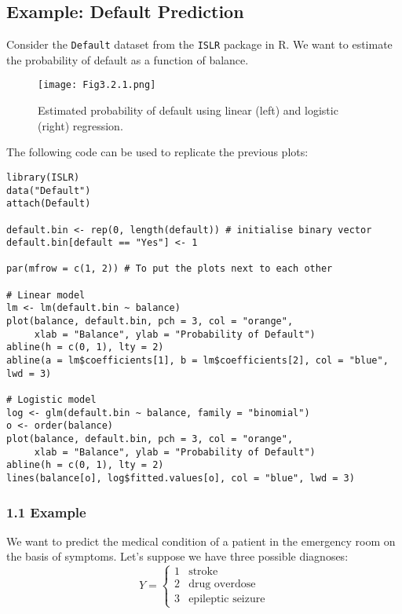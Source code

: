\documentclass[11pt]{article}
\begin{document}
\subsection{Example: Default Prediction}

Consider the \texttt{Default} dataset from the \texttt{ISLR} package in R. We want to estimate the probability of default as a function of balance.

\begin{figure}[ht]
\centering
\texttt{[image: Fig3.2.1.png]}
\caption{Estimated probability of default using linear (left) and logistic (right) regression.}
\end{figure}

The following code can be used to replicate the previous plots:

\begin{verbatim}
library(ISLR)
data("Default")
attach(Default)

default.bin <- rep(0, length(default)) # initialise binary vector
default.bin[default == "Yes"] <- 1

par(mfrow = c(1, 2)) # To put the plots next to each other

# Linear model
lm <- lm(default.bin ~ balance)
plot(balance, default.bin, pch = 3, col = "orange",
     xlab = "Balance", ylab = "Probability of Default")
abline(h = c(0, 1), lty = 2)
abline(a = lm$coefficients[1], b = lm$coefficients[2], col = "blue", lwd = 3)

# Logistic model
log <- glm(default.bin ~ balance, family = "binomial")
o <- order(balance)
plot(balance, default.bin, pch = 3, col = "orange",
     xlab = "Balance", ylab = "Probability of Default")
abline(h = c(0, 1), lty = 2)
lines(balance[o], log$fitted.values[o], col = "blue", lwd = 3)
\end{verbatim}

\subsubsection{1.1 Example}

We want to predict the medical condition of a patient in the emergency room on the basis of symptoms. Let's suppose we have three possible diagnoses:
\[
Y =
\begin{cases}
1 & \text{stroke} \\
2 & \text{drug overdose} \\
3 & \text{epileptic seizure}
\end{cases}
\]
\end{document}
